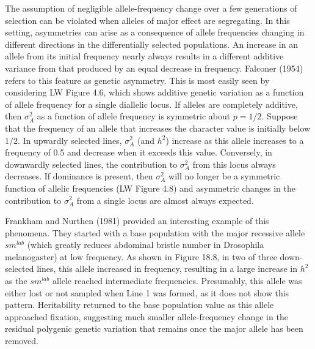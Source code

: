 \documentclass{article}
\begin{document}
The assumption of negligible allele-frequency change over a few generations of selection can be violated when alleles of major effect are segregating. In this setting, asymmetries can arise as a consequence of allele frequencies changing in different directions in the differentially selected populations. An increase in an allele from its initial frequency nearly always results in a different additive variance from that produced by an equal decrease in frequency. Falconer (1954) refers to this feature as genetic asymmetry. This is most easily seen by considering LW Figure 4.6, which shows additive genetic variation as a function of allele frequency for a single diallelic locus. If alleles are completely additive, then  $ \sigma_A^2 $ as a function of allele frequency is symmetric about  $ p = 1/2 $. Suppose that the frequency of an allele that increases the character value is initially below  $ 1/2 $. In upwardly selected lines,  $ \sigma_A^2 $ (and  $ h^2 $) increase as this allele increases to a frequency of 0.5 and decrease when it exceeds this value. Conversely, in downwardly selected lines, the contribution to  $ \sigma_A^2 $ from this locus always decreases. If dominance is present, then  $ \sigma_A^2 $ will no longer be a symmetric function of allelic frequencies (LW Figure 4.8) and asymmetric changes in the contribution to  $ \sigma_A^2 $ from a single locus are almost always expected.

Frankham and Nurthen (1981) provided an interesting example of this phenomena. They started with a base population with the major recessive allele  $ sm^{lab} $ (which greatly reduces abdominal bristle number in Drosophila melanogaster) at low frequency. As shown in Figure 18.8, in two of three down-selected lines, this allele increased in frequency, resulting in a large increase in  $ h^{2} $ as the  $ sm^{lab} $ allele reached intermediate frequencies. Presumably, this allele was either lost or not sampled when Line 1 was formed, as it does not show this pattern. Heritability returned to the base population value as this allele approached fixation, suggesting much smaller allele-frequency change in the residual polygenic genetic variation that remains once the major allele has been removed.
\end{document}

